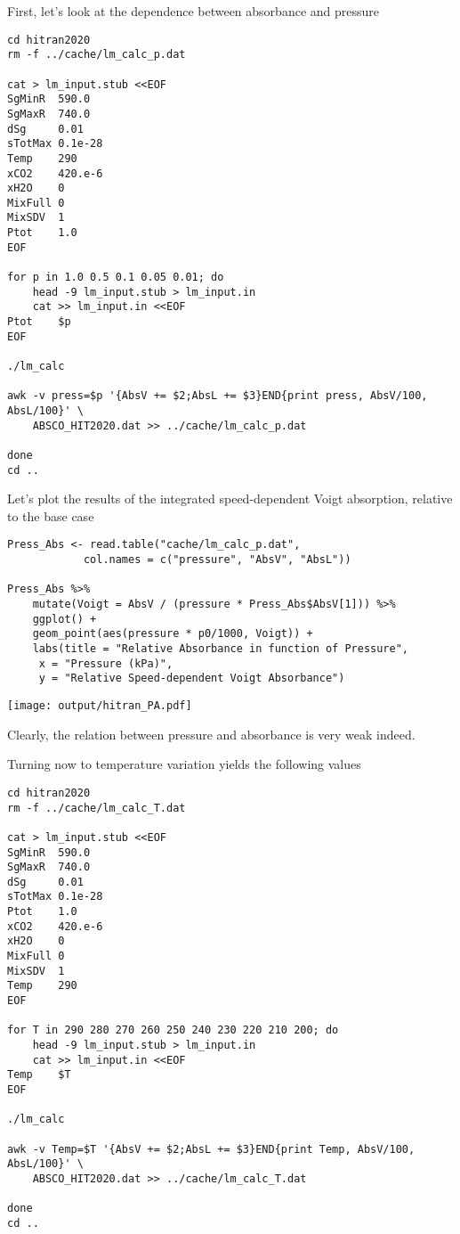 \documentclass[10pt,a4paper,titlepage]{article}
\begin{document}
First, let's look at the dependence between absorbance and pressure
\begin{lstlisting}
cd hitran2020
rm -f ../cache/lm_calc_p.dat

cat > lm_input.stub <<EOF
SgMinR  590.0
SgMaxR  740.0
dSg     0.01
sTotMax 0.1e-28
Temp    290
xCO2    420.e-6
xH2O    0
MixFull 0
MixSDV  1
Ptot    1.0
EOF

for p in 1.0 0.5 0.1 0.05 0.01; do
    head -9 lm_input.stub > lm_input.in
    cat >> lm_input.in <<EOF
Ptot    $p
EOF

./lm_calc

awk -v press=$p '{AbsV += $2;AbsL += $3}END{print press, AbsV/100, AbsL/100}' \
    ABSCO_HIT2020.dat >> ../cache/lm_calc_p.dat

done
cd ..
\end{lstlisting}

Let's plot the results of the integrated speed-dependent Voigt
absorption, relative to the base case
\begin{lstlisting}
Press_Abs <- read.table("cache/lm_calc_p.dat",
			col.names = c("pressure", "AbsV", "AbsL"))

Press_Abs %>%
    mutate(Voigt = AbsV / (pressure * Press_Abs$AbsV[1])) %>%
    ggplot() +
    geom_point(aes(pressure * p0/1000, Voigt)) +
    labs(title = "Relative Absorbance in function of Pressure",
	 x = "Pressure (kPa)",
	 y = "Relative Speed-dependent Voigt Absorbance")
\end{lstlisting}

\texttt{[image: output/hitran\_PA.pdf]}

Clearly, the relation between pressure and absorbance is very weak indeed.

Turning now to temperature variation yields the following values
\begin{lstlisting}
cd hitran2020
rm -f ../cache/lm_calc_T.dat

cat > lm_input.stub <<EOF
SgMinR  590.0
SgMaxR  740.0
dSg     0.01
sTotMax 0.1e-28
Ptot    1.0
xCO2    420.e-6
xH2O    0
MixFull 0
MixSDV  1
Temp    290
EOF

for T in 290 280 270 260 250 240 230 220 210 200; do
    head -9 lm_input.stub > lm_input.in
    cat >> lm_input.in <<EOF
Temp    $T
EOF

./lm_calc

awk -v Temp=$T '{AbsV += $2;AbsL += $3}END{print Temp, AbsV/100, AbsL/100}' \
    ABSCO_HIT2020.dat >> ../cache/lm_calc_T.dat

done
cd ..
\end{lstlisting}
\end{document}
